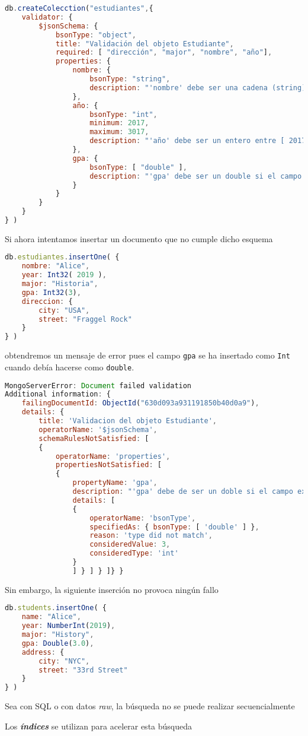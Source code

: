 \begin{lstlisting}[language=JavaScript]
db.createColecction("estudiantes",{
	validator: {
		$jsonSchema: {
			bsonType: "object",
			title: "Validación del objeto Estudiante",
			required: [ "dirección", "major", "nombre", "año"],
			properties: {
				nombre: {
					bsonType: "string",
					description: "'nombre' debe ser una cadena (string) y es obligatorio"
				},
				año: {
					bsonType: "int",
					minimum: 2017,
					maximum: 3017,
					description: "'año' debe ser un entero entre [ 2017, 3017 ] y es obligatorio"
				},
				gpa: {
					bsonType: [ "double" ],
					description: "'gpa' debe ser un double si el campo existe"
				}
			}
		}
	}
} )
\end{lstlisting}
Si ahora intentamos insertar un documento que no cumple dicho esquema 
\begin{lstlisting}[language=JavaScript]
db.estudiantes.insertOne( {
	nombre: "Alice",
	year: Int32( 2019 ),
	major: "Historia",
	gpa: Int32(3),
	direccion: {
		city: "USA",
		street: "Fraggel Rock"
	}
} ) 
\end{lstlisting}
obtendremos un mensaje de error pues el campo \texttt{gpa} se ha insertado como \texttt{Int} cuando debía hacerse como \texttt{double}.
\begin{lstlisting}[language=JavaScript]
MongoServerError: Document failed validation
Additional information: {
	failingDocumentId: ObjectId("630d093a931191850b40d0a9"),
	details: {
		title: 'Validacion del objeto Estudiante',
		operatorName: '$jsonSchema',
		schemaRulesNotSatisfied: [
		{
			operatorName: 'properties',
			propertiesNotSatisfied: [
			{
				propertyName: 'gpa',
				description: "'gpa' debe de ser un doble si el campo existe",
				details: [
				{
					operatorName: 'bsonType',
					specifiedAs: { bsonType: [ 'double' ] },
					reason: 'type did not match',
					consideredValue: 3,
					consideredType: 'int'
				}
				] } ] } ]} }
\end{lstlisting}
Sin embargo, la siguiente inserción no provoca ningún fallo
\begin{lstlisting}[language=JavaScript]
db.students.insertOne( {
	name: "Alice",
	year: NumberInt(2019),
	major: "History",
	gpa: Double(3.0),
	address: {
		city: "NYC",
		street: "33rd Street"
	}
} )
\end{lstlisting}
Sea con SQL o con datos \textit{raw}, la búsqueda no se puede realizar secuencialmente

Los \textbf{\textit{índices}} se utilizan para acelerar esta búsqueda

